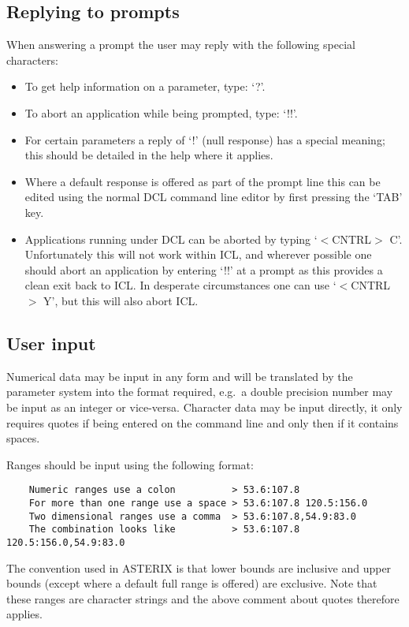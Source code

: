 \subsection{Replying to prompts }

When answering a prompt the user may reply with the following special
characters:

\begin{itemize}
\item To get help information on a parameter, type:  `?'.
\item To abort an application while being prompted, type:  `!!'.
\item For certain parameters a reply of  `!' (null response) has 
a special meaning; this should be detailed in the help where it applies.
\item Where a default response is offered as part of the prompt line this can
be edited using the normal DCL command line editor by first pressing
the `TAB' key.
\item Applications running under DCL can be aborted by typing `$<$CNTRL$>$ C'.
Unfortunately this will not work within ICL, and wherever possible one
should abort an application by entering `!!' at a prompt as this provides a 
clean exit back to ICL. In desperate circumstances one can use `$<$CNTRL$>$ Y',
but this will also abort ICL.
\end{itemize}

\subsection{User input }

Numerical data may be input in any form and will be translated by the parameter
system into the format required, e.g.\ a double precision number may be input 
as an integer or vice-versa. Character data may be input directly, it only
requires quotes if being entered on the command line and only then if it
contains spaces.

Ranges should be input using the following format:
\begin{verbatim}
    Numeric ranges use a colon          > 53.6:107.8
    For more than one range use a space > 53.6:107.8 120.5:156.0 
    Two dimensional ranges use a comma  > 53.6:107.8,54.9:83.0
    The combination looks like          > 53.6:107.8 120.5:156.0,54.9:83.0
\end{verbatim}
The convention used in ASTERIX is that lower bounds are inclusive and upper 
bounds (except where a default full range is offered) are exclusive.
Note that these ranges are character strings and the above comment about
quotes therefore applies.

